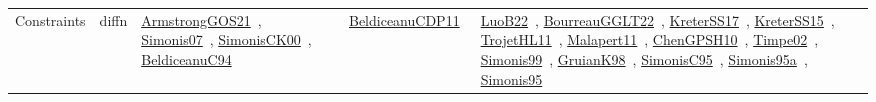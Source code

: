 {\begin{longtable}{lp{3cm}>{\raggedright\arraybackslash}p{6cm}>{\raggedright\arraybackslash}p{6cm}>{\raggedright\arraybackslash}p{8cm}}
Constraints & diffn & \href{works/ArmstrongGOS21.pdf}{ArmstrongGOS21}~\cite{ArmstrongGOS21}, \href{works/Simonis07.pdf}{Simonis07}~\cite{Simonis07}, \href{works/SimonisCK00.pdf}{SimonisCK00}~\cite{SimonisCK00}, \href{works/BeldiceanuC94.pdf}{BeldiceanuC94}~\cite{BeldiceanuC94} & \href{works/BeldiceanuCDP11.pdf}{BeldiceanuCDP11}~\cite{BeldiceanuCDP11} & \href{works/LuoB22.pdf}{LuoB22}~\cite{LuoB22}, \href{works/BourreauGGLT22.pdf}{BourreauGGLT22}~\cite{BourreauGGLT22}, \href{works/KreterSS17.pdf}{KreterSS17}~\cite{KreterSS17}, \href{works/KreterSS15.pdf}{KreterSS15}~\cite{KreterSS15}, \href{works/TrojetHL11.pdf}{TrojetHL11}~\cite{TrojetHL11}, \href{works/Malapert11.pdf}{Malapert11}~\cite{Malapert11}, \href{works/ChenGPSH10.pdf}{ChenGPSH10}~\cite{ChenGPSH10}, \href{works/Timpe02.pdf}{Timpe02}~\cite{Timpe02}, \href{works/Simonis99.pdf}{Simonis99}~\cite{Simonis99}, \href{works/GruianK98.pdf}{GruianK98}~\cite{GruianK98}, \href{works/SimonisC95.pdf}{SimonisC95}~\cite{SimonisC95}, \href{works/Simonis95a.pdf}{Simonis95a}~\cite{Simonis95a}, \href{works/Simonis95.pdf}{Simonis95}~\cite{Simonis95}\\

\end{longtable}}
